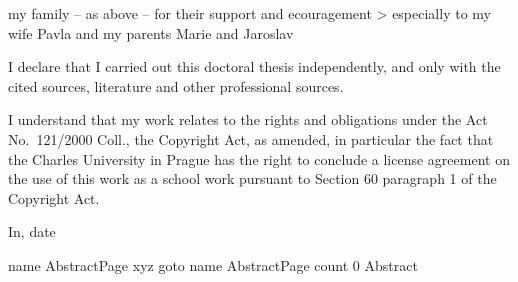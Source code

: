 \> my family -- as above -- for their support and ecouragement
\>> especially to my wife Pavla and my parents Marie and Jaroslav
\fi

\eject


\hbox{}\vfil

I declare that I carried out this doctoral thesis independently, and only with the cited sources, literature and other professional sources.

I understand that my work relates to the rights and obligations under the Act No.~121/2000 Coll., the Copyright Act, as amended, in particular the fact that the Charles University in Prague has the right to conclude a license agreement on the use of this work as a school work pursuant to Section 60 paragraph 1 of the Copyright Act.

\baselineskip

In\hskip 2cm, date

\baselineskip
\eject


\hbox{}%

\pdfdest name {AbstractPage} xyz
\pdfoutline goto name {AbstractPage} count 0 {Abstract}%

\vfil

\bgroup

\egroup

\vfil

